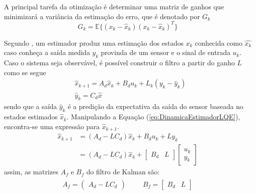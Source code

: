A principal tarefa da otimização é determinar uma matriz de ganhos que minimizará a variância da estimação do erro, que é denotado por $G_k$
\begin{equation}\label{eq:VarianciaEstimacao}
    G_k = \mathbb{E} \{(x_k-\hat{x}_k)(x_k-\hat{x}_k)^T\}
\end{equation}{}

Segundo \cite{Steven:17}, um estimador produz uma estimação dos estados $x_k$ conhecida como $\hat{x_k}$ caso conheça a saída medida $y_k$ provinda de um sensor e o sinal de entrada $u_k$. Caso o sistema seja observável, é possível construir o filtro a partir do ganho $L$ como se segue
\begin{equation}\label{eq:DinamicaEstimadorLQE}
    \begin{array}{cc}
        &  \hat{x}_{k+1} = A_d \hat{x}_k + B_d u_k + L_k(y_k - \hat{y}_k) \\
        &  \hat{y}_k = C_d\hat{x}
    \end{array}{}
\end{equation}{}
sendo que a saída $\hat{y}_k$ é a predição da expectativa da saída do sensor baseada no estados estimados $\hat{x}_k$. Manipulando a Equação
(\ref{eq:DinamicaEstimadorLQE}), encontra-se uma expressão para $\hat{x}_{k+1}$.
\begin{align}
     \hat{x}_{k+1} & = (A_d - LC_d)\hat{x}_k + B_du_k + Ly_k \nonumber \\ 
                   & = (A_d - LC_d)\hat{x}_k + \left[\begin{array}{cc}
                                            B_d & L
                                            \end{array}{}\right]    \left[\begin{array}{cc}
                                        u_k\\
                                        y_k
                                    \end{array}{}\right]
\end{align}
assim, as matrizes $A_f$ e $B_f$ do filtro de Kalman são:
\begin{align}\label{eq:MatrizesFiltroKalman}
    \begin{array}{cc}
        A_f = \left(\begin{array}{c}                   
                    A_d - LC_d
                \end{array}\right) ~~~~~~~~~~~
        B_f = \left[\begin{array}{cc}
                 B_d & L 
              \end{array}\right]
    \end{array}{}
\end{align}{}

